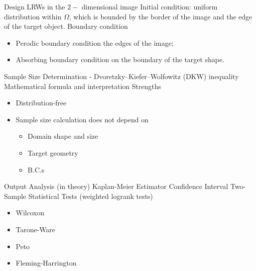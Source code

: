 \documentclass{article}
\begin{document}
\begin{outline}[enumerate]
     \3 Design LRWs in the $2-$ dimensional image
         \4 Initial condition: uniform distribution within $\Omega$, which is bounded by the border of the image and the edge of the target object.
         \4 Boundary condition
           \begin{itemize}
             \item Perodic boundary condition the edges of the image;
             \item Absorbing boundary condition on the boundary of the target shape.
           \end{itemize}
      
             
      \3 Sample Size Determination - Dvoretzky–Kiefer–Wolfowitz (DKW) inequality \cite{dvoretzky1956asymptotic}
        \4 Mathematical formula and interpretation
        \4 Strengths
          \begin{itemize}
            \item Distribution-free
            \item Sample size calculation does not depend on 
              \begin{itemize}
                \item Domain shape and size
                \item Target geometry
                \item B.C.s
              \end{itemize}
          \end{itemize}
          
     \3 Output Analysis (in theory)
        \4 Kaplan-Meier Estimator \cite{kaplan1958nonparametric} \cite{aalen2008survival}
        \4 Confidence Interval \cite{greenwoodnatural} \cite{hosmer2011applied} \cite{kalbfleisch2011statistical}\cite{sawyer2003greenwood}
        \4 Two-Sample Statistical Tests (weighted logrank tests) \cite{custodio2007diagnostics} \cite{agarwal2012statistics} \cite{karadeniz2017examining} \cite{leton2001equivalence} \cite{etikan2017kaplan} \cite{harrington1982class}
          \begin{itemize}
            \item Wilcoxon
            \item Tarone-Ware
            \item Peto
            \item Fleming-Harrington
          \end{itemize}
          




\end{outline}
\end{document}
